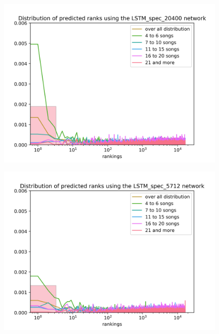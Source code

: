 \begin{figure}[h!]
\centering
\begin{minipage}{.5\textwidth}
  \centering
  \includegraphics[width=1\linewidth]{./img/lstm_spec_20400_graph.png}
  \label{fig:lstm_spec_20400_distribution}
\end{minipage}%
\begin{minipage}{.5\textwidth}
  \centering
  \includegraphics[width=1\linewidth]{./img/lstm_spec_5712_graph.png}
  \label{fig:lstm_spec_5712_distribution}
\end{minipage}
\end{figure}\label{fig:lstm_spec_distributions}

